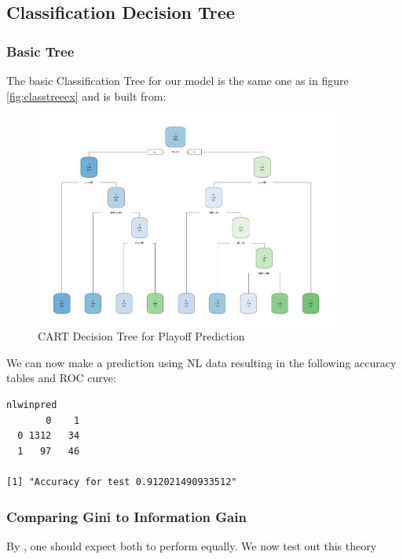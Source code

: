 \documentclass[11pt,a4paper]{report}
\begin{document}
\subsection{Classification Decision Tree}
\subsubsection{Basic Tree}
The basic Classification Tree for our model is the same one as in figure \ref{fig:classtreeex} and is built from:
\begin{figure}
    \centering
    \includegraphics[width=10cm]{finalplots/classtree.pdf}
    \caption{CART Decision Tree for Playoff Prediction}
    \label{fig:classdt}
\end{figure}
We can now make a prediction using NL data resulting in the following accuracy tables and ROC curve:
\begin{verbatim}
nlwinpred
       0    1
  0 1312   34
  1   97   46

[1] "Accuracy for test 0.912021490933512"
\end{verbatim}

\subsubsection{Comparing Gini to Information Gain}
By \cite{murthy1995}, one should expect both to perform equally.
We now test out this theory
\end{document}
